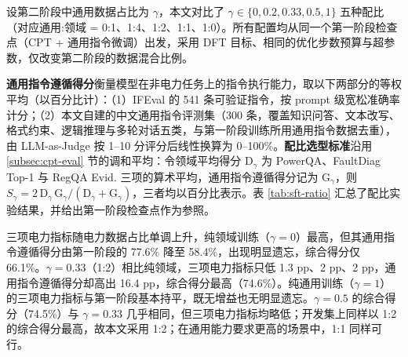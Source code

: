 \documentclass[fontset=fandol,type=master,campus=shenzhen,etitleauto=true]{hithesisbook}
\begin{document}
设第二阶段中通用数据占比为 $\gamma$，本文对比了 $\gamma \in \{0, 0.2, 0.33, 0.5, 1\}$ 五种配比（对应通用:领域 = 0:1、1:4、1:2、1:1、1:0）。所有配置均从同一个第一阶段检查点（CPT + 通用指令微调）出发，采用 DFT 目标、相同的优化步数预算与超参数，仅改变第二阶段的数据混合比例。

\textbf{通用指令遵循得分}衡量模型在非电力任务上的指令执行能力，取以下两部分的等权平均（以百分比计）：（1）IFEval\cite{ref85} 的 541 条可验证指令，按 prompt 级宽松准确率计分；（2）本文自建的中文通用指令评测集（300 条，覆盖知识问答、文本改写、格式约束、逻辑推理与多轮对话五类，与第一阶段训练所用通用指令数据去重），由 LLM-as-Judge 按 1--10 分评分后线性换算为 0--100\%。\textbf{配比选型标准}沿用 \ref{subsec:cpt-eval} 节的调和平均：令领域平均得分 $\text{D}_\gamma$ 为 PowerQA、FaultDiag Top-1 与 RegQA Evid. 三项的算术平均，通用指令遵循得分记为 $\text{G}_\gamma$，则 $S_\gamma = 2\,\text{D}_\gamma\,\text{G}_\gamma / (\text{D}_\gamma + \text{G}_\gamma)$，三者均以百分比表示。表 \ref{tab:sft-ratio} 汇总了配比实验结果，并给出第一阶段检查点作为参照。

\begin{table}[htbp]
\centering
\caption{SFT 第二阶段通用-领域数据配比实验结果}
\label{tab:sft-ratio}
\small
\setlength{\tabcolsep}{4pt}
\end{table}

三项电力指标随电力数据占比单调上升，纯领域训练（$\gamma = 0$）最高，但其通用指令遵循得分由第一阶段的 77.6\% 降至 58.4\%，出现明显遗忘，综合得分仅 66.1\%。$\gamma = 0.33$（1:2）相比纯领域，三项电力指标只低 1.3 pp、2 pp、2 pp，通用指令遵循得分却高出 16.4 pp，综合得分最高（74.6\%）。纯通用训练（$\gamma = 1$）的三项电力指标与第一阶段基本持平，既无增益也无明显遗忘。$\gamma = 0.5$ 的综合得分（74.5\%）与 $\gamma = 0.33$ 几乎相同，但三项电力指标均略低；开发集上同样以 1:2 的综合得分最高，故本文采用 1:2；在通用能力要求更高的场景中，1:1 同样可行。
\end{document}
